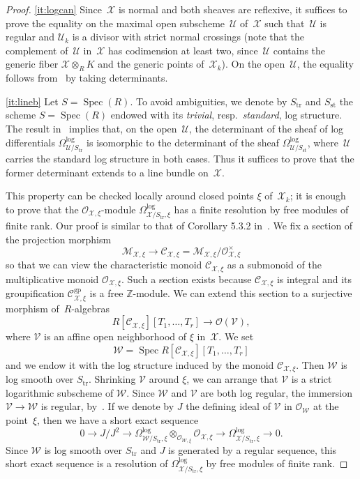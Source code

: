 \documentclass[11pt]{article}
\newcommand{\skpt}{\smallskip}
\let\mathcal\mathscr
\theoremstyle{definition}
\numberwithin{equation}{subsection}
\newcommand{\Z}{\ensuremath{\mathbb{Z}}}
\newcommand{\cX}{\ensuremath{\mathscr{X}}}
\newcommand{\cU}{\ensuremath{\mathscr{U}}}
\newcommand{\cV}{\ensuremath{\mathscr{V}}}
\newcommand{\cW}{\ensuremath{\mathscr{W}}}
\newcommand{\gp}{\mathrm{gp}}
\newcommand{\st}{\mathrm{st}}
\newcommand{\tr}{\mathrm{tr}}
\DeclareMathOperator{\Spec}{Spec}
\begin{document}
\skpt
\begin{proof}
\eqref{it:logcan} Since~$\cX$ is normal and both sheaves are reflexive, it suffices to prove the equality on the maximal open subscheme~$\cU$ of~$\cX$ such that~$\cU$ is regular and $\cU_k$ is a divisor with strict normal crossings (note that the complement of~$\cU$ in~$\cX$ has codimension at least two, since~$\cU$ contains the generic fiber $\cX\otimes_R K$ and the generic points of~$\cX_k$). On the open~$\cU$, the equality follows from~\cite[5.3.4]{kato-saito} by taking determinants.

\eqref{it:lineb}
Let $S=\Spec(R)$.
To avoid ambiguities, we denote by $S_{\tr}$ and $S_{\st}$ the scheme $S=\Spec(R)$ endowed with its {\em trivial}, resp.~{\em standard}, log structure.
The result in~\cite[5.3.4]{kato-saito} implies that, on the open~$\cU$, the determinant of the sheaf of log differentials $\Omega^{\log}_{\cU/S_{\tr}}$ is isomorphic to the determinant of the sheaf $\Omega^{\log}_{\cU/S_{\st}}$, where~$\cU$ carries the standard log structure in both cases. Thus it suffices to prove that the former determinant extends to a line bundle on~$\cX$.

This property can be checked locally around closed points $\xi$ of~$\cX_k$;
it is enough to prove that the $\mathcal{O}_{\cX,\xi}$-module $\Omega^{\log}_{\cX/S_{\tr},\xi}$ has a finite resolution by free modules of finite rank. Our proof is similar to that of Corollary 5.3.2 in~\cite{kato-saito}.
We fix a section of the projection morphism
\[
\mathcal{M}_{\cX,\xi}\to \mathcal{C}_{\cX,\xi}=\mathcal{M}_{\cX,\xi}/\mathcal{O}^{\times}_{\cX,\xi}
\]
so that we can view the characteristic monoid $\mathcal{C}_{\cX,\xi}$ as a submonoid of the multiplicative monoid $\mathcal{O}_{\cX,\xi}$. Such a section exists because $\mathcal{C}_{\cX,\xi}$ is integral and its groupification $\mathcal{C}^{\gp}_{\cX,\xi}$ is a free $\Z$-module. We can extend this section to a surjective morphism of~$R$\nobreakdash-algebras
\[
R[\mathcal{C}_{\cX,\xi}][T_1,\ldots,T_r]\to \mathcal{O}(\cV),
\]
where $\cV$ is an affine open neighborhood of $\xi$ in~$\cX$.
We set
\[
\cW=\Spec R[\mathcal{C}_{\cX,\xi}][T_1,\ldots,T_r]
\]
and we endow it with the log structure induced by the monoid $\mathcal{C}_{\cX,\xi}$.
Then $\cW$ is log smooth over $S_{\tr}$. Shrinking $\cV$ around $\xi$, we can arrange that $\cV$ is a strict logarithmic subscheme of $\cW$.
Since $\cW$ and $\cV$ are both log regular, the immersion $\cV\to \cW$ is regular, by~\cite[4.2]{kato}. If we denote by $J$ the defining ideal of $\cV$ in $\mathcal{O}_{\cW}$ at the point~$\xi$, then we have a short exact sequence
\begin{equation}\label{eq:res}
0\to J/J^2 \to \Omega^{\log}_{\cW/S_{\tr},\xi}\otimes_{\mathcal{O}_{\cW,\xi} } \mathcal{O}_{\cX,\xi}\to \Omega^{\log}_{\cX/S_{\tr},\xi} \to 0.
\end{equation}
Since $\cW$ is log smooth over $S_{\tr}$ and $J$ is generated by a regular sequence, this short exact sequence is a resolution of $\Omega^{\log}_{\cX/S_{\tr},\xi}$ by free modules of finite rank.


\end{proof}
\end{document}
